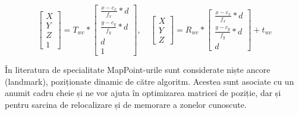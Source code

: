 \documentclass[12pt,a4paper]{report}
\begin{document}
\begin{equation} 
\begin{bmatrix}
X \\
Y \\
Z \\
1
\end{bmatrix} = T_{wc} *  
\begin{bmatrix}
\frac{x - c_x}{f_x} * d \\
\frac{y- c_y}{f_y} * d \\
d \\
1
\end{bmatrix}, \quad{}
\begin{bmatrix}
    X \\
    Y \\
    Z 
\end{bmatrix} = R_{wc} *
\begin{bmatrix}
    \frac{x - c_x}{f_x} * d \\
    \frac{y- c_y}{f_y} * d \\
    d
    \end{bmatrix} + t_{wc}
\end{equation}

În literatura de specialitate MapPoint-urile sunt considerate niște ancore (landmark),
 poziționate dinamic de către algoritm. Acestea sunt asociate
cu un anumit cadru cheie și ne vor ajuta în optimizarea matricei de poziție, dar și
pentru sarcina de relocalizare și de memorare a zonelor cunoscute.
\end{document}
